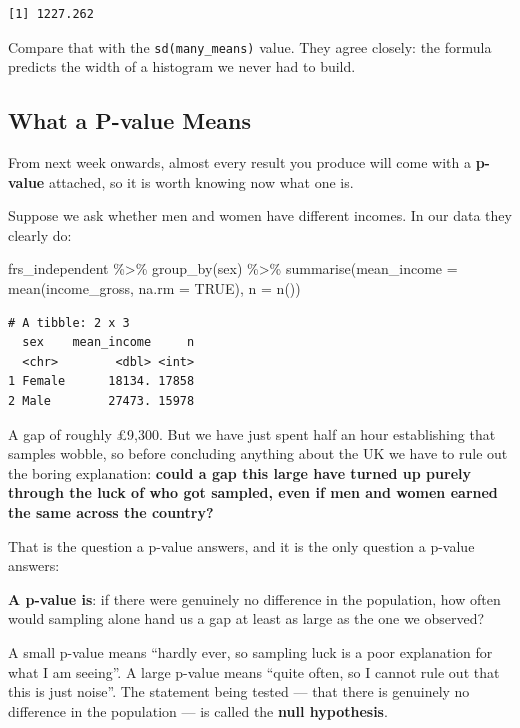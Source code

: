 \documentclass[
  letterpaper,
  DIV=11,
  numbers=noendperiod]{scrreprt}
\newenvironment{Shaded}{\begin{snugshade}}{\end{snugshade}}
\newcommand{\AttributeTok}[1]{\textcolor[rgb]{0.40,0.45,0.13}{#1}}
\newcommand{\ConstantTok}[1]{\textcolor[rgb]{0.56,0.35,0.01}{#1}}
\newcommand{\FunctionTok}[1]{\textcolor[rgb]{0.28,0.35,0.67}{#1}}
\newcommand{\NormalTok}[1]{\textcolor[rgb]{0.00,0.23,0.31}{#1}}
\newcommand{\SpecialCharTok}[1]{\textcolor[rgb]{0.37,0.37,0.37}{#1}}
\begin{document}
\begin{verbatim}
[1] 1227.262
\end{verbatim}

Compare that with the \texttt{sd(many\_means)} value. They agree
closely: the formula predicts the width of a histogram we never had to
build.

\subsection{What a P-value Means}\label{what-a-p-value-means}

From next week onwards, almost every result you produce will come with a
\textbf{p-value} attached, so it is worth knowing now what one is.

Suppose we ask whether men and women have different incomes. In our data
they clearly do:

\begin{Shaded}
\begin{Highlighting}[]
\NormalTok{frs\_independent }\SpecialCharTok{\%\textgreater{}\%}
  \FunctionTok{group\_by}\NormalTok{(sex) }\SpecialCharTok{\%\textgreater{}\%}
  \FunctionTok{summarise}\NormalTok{(}\AttributeTok{mean\_income =} \FunctionTok{mean}\NormalTok{(income\_gross, }\AttributeTok{na.rm =} \ConstantTok{TRUE}\NormalTok{), }\AttributeTok{n =} \FunctionTok{n}\NormalTok{())}
\end{Highlighting}
\end{Shaded}

\begin{verbatim}
# A tibble: 2 x 3
  sex    mean_income     n
  <chr>        <dbl> <int>
1 Female      18134. 17858
2 Male        27473. 15978
\end{verbatim}

A gap of roughly £9,300. But we have just spent half an hour
establishing that samples wobble, so before concluding anything about
the UK we have to rule out the boring explanation: \textbf{could a gap
this large have turned up purely through the luck of who got sampled,
even if men and women earned the same across the country?}

That is the question a p-value answers, and it is the only question a
p-value answers:

\textbf{A p-value is}: if there were genuinely no difference in the
population, how often would sampling alone hand us a gap at least as
large as the one we observed?

A small p-value means ``hardly ever, so sampling luck is a poor
explanation for what I am seeing''. A large p-value means ``quite often,
so I cannot rule out that this is just noise''. The statement being
tested --- that there is genuinely no difference in the population ---
is called the \textbf{null hypothesis}.
\end{document}
